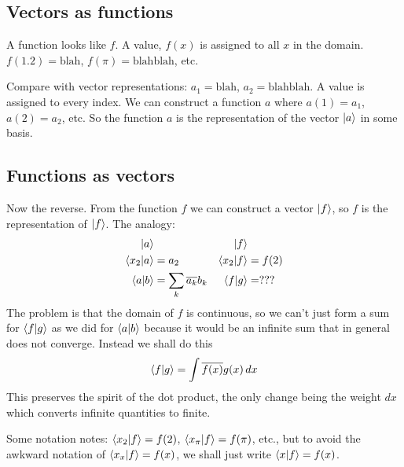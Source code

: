\documentclass[12pt, oneside, letterpaper, fleqn]{article}
\begin{document}
\subsection{Vectors as functions}
A function looks like $f$. A value, $f(x)$ is assigned to all $x$ in
the domain. $f(1.2) = \text{blah}$, $f(\pi) = \text{blahblah}$, etc.

Compare with vector representations: $a_1 = \text{blah}$, $a_2 =
\text{blahblah}$. A value is assigned to every index. We can construct a
function $a$ where $a(1) = a_1$, $a(2) = a_2$, etc. So the function $a$
is the representation of the vector $\left\lvert a\right\rangle$ in some basis.


\subsection{Functions as vectors}

Now the reverse. From the function $f$ we can construct a vector
$\left\lvert f\right\rangle$, so $f$ is the representation of $\left\lvert f\right\rangle$. The analogy:
\begin{align*}
\left\lvert a\right\rangle& & \left\lvert f\right\rangle&\\
\left\langle x_2\middle\vert a\right\rangle &= a_2 & \left\langle x_2\middle\vert f\right\rangle &= f(2)\\
\left\langle a\middle\vert b\right\rangle &= \sum_k \overline{a_k}b_k & \left\langle f\middle\vert g\right\rangle &= ???
\end{align*}
The problem is that the domain of $f$ is continuous, so we can't just
form a sum for $\left\langle f\middle\vert g\right\rangle$ as we did for $\left\langle a\middle\vert b\right\rangle$ because it
would be an infinite sum that in general does not converge. Instead we
shall do this
\begin{align}\label{eq:innerp}
\left\langle f\middle\vert g\right\rangle = \int \overline{f(x)}g(x)\,dx
\end{align}
This preserves the spirit of the dot product, the only change being the
weight $dx$ which converts infinite quantities to finite.

Some notation notes: $\left\langle x_2\middle\vert f\right\rangle = f(2)$, $\left\langle x_\pi\middle\vert f\right\rangle =
f(\pi)$, etc., but to avoid the awkward notation of $\left\langle x_x\middle\vert f\right\rangle =
f(x)$, we shall just write $\left\langle x\middle\vert f\right\rangle = f(x)$.
\end{document}
